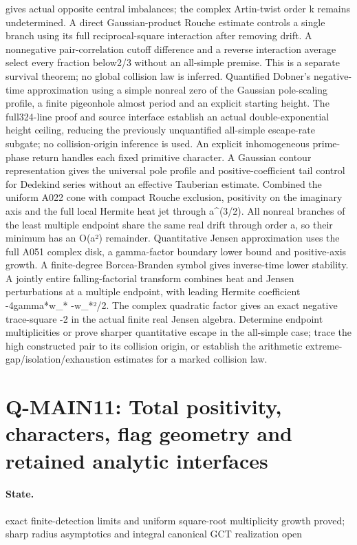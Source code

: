 gives actual opposite central imbalances; the complex Artin-twist order k remains undetermined. A direct Gaussian-product Rouche estimate controls a single branch using its full reciprocal-square interaction after removing drift. A nonnegative pair-correlation cutoff difference and a reverse interaction average select every fraction below2/3 without an all-simple premise. This is a separate survival theorem; no global collision law is inferred. Quantified Dobner's negative-time approximation using a simple nonreal zero of the Gaussian pole-scaling profile, a finite pigeonhole almost period and an explicit starting height. The full324-line proof and source interface establish an actual double-exponential height ceiling, reducing the previously unquantified all-simple escape-rate subgate; no collision-origin inference is used. An explicit inhomogeneous prime-phase return handles each fixed primitive character. A Gaussian contour representation gives the universal pole profile and positive-coefficient tail control for Dedekind series without an effective Tauberian estimate. Combined the uniform A022 cone with compact Rouche exclusion, positivity on the imaginary axis and the full local Hermite heat jet through a\textasciicircum{}(3/2). All nonreal branches of the least multiple endpoint share the same real drift through order a, so their minimum has an O(a²) remainder. Quantitative Jensen approximation uses the full A051 complex disk, a gamma-factor boundary lower bound and positive-axis growth. A finite-degree Borcea-Branden symbol gives inverse-time lower stability. A jointly entire falling-factorial transform combines heat and Jensen perturbations at a multiple endpoint, with leading Hermite coefficient -4gamma*w\_* -w\_*²/2. The complex quadratic factor gives an exact negative trace-square -2 in the actual finite real Jensen algebra. Determine endpoint multiplicities or prove sharper quantitative escape in the all-simple case; trace the high constructed pair to its collision origin, or establish the arithmetic extreme-gap/isolation/exhaustion estimates for a marked collision law.

\section{Q-MAIN11: Total positivity, characters, flag geometry and retained analytic interfaces}
\paragraph{State.} exact finite-detection limits and uniform square-root multiplicity growth proved; sharp radius asymptotics and integral canonical GCT realization open
